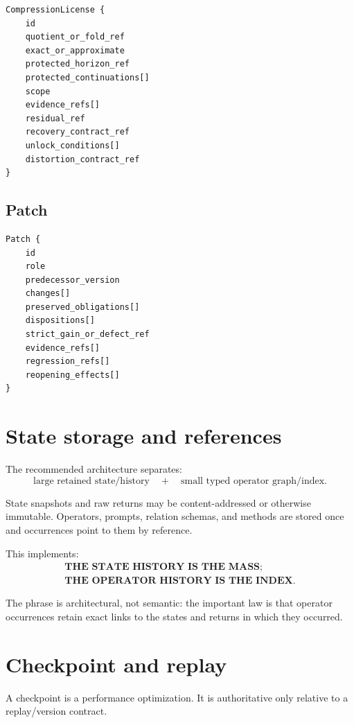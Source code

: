\documentclass[11pt,oneside]{article}
\begin{document}
\begin{lstlisting}[basicstyle=\ttfamily\small]
CompressionLicense {
    id
    quotient_or_fold_ref
    exact_or_approximate
    protected_horizon_ref
    protected_continuations[]
    scope
    evidence_refs[]
    residual_ref
    recovery_contract_ref
    unlock_conditions[]
    distortion_contract_ref
}
\end{lstlisting}

\subsection{Patch}

\begin{lstlisting}[basicstyle=\ttfamily\small]
Patch {
    id
    role
    predecessor_version
    changes[]
    preserved_obligations[]
    dispositions[]
    strict_gain_or_defect_ref
    evidence_refs[]
    regression_refs[]
    reopening_effects[]
}
\end{lstlisting}

\section{State storage and references}

The recommended architecture separates:
\[
\boxed{
\text{large retained state/history}
\quad+\quad
\text{small typed operator graph/index}.
}
\]

State snapshots and raw returns may be content-addressed or otherwise immutable.  Operators, prompts, relation schemas, and methods are stored once and occurrences point to them by reference.

This implements:
\[
\boxed{
\begin{gathered}
\textbf{THE STATE HISTORY IS THE MASS;}\\
\textbf{THE OPERATOR HISTORY IS THE INDEX.}
\end{gathered}
}
\]

The phrase is architectural, not semantic: the important law is that operator occurrences retain exact links to the states and returns in which they occurred.

\section{Checkpoint and replay}

A checkpoint is a performance optimization.  It is authoritative only relative to a replay/version contract.
\end{document}
